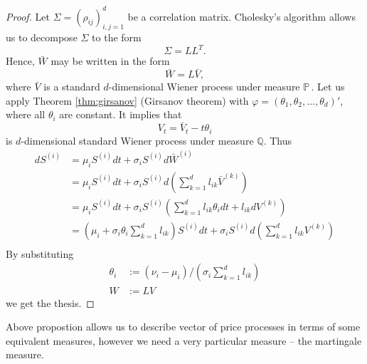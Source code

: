 \documentclass[a4paper,12pt, oneside]{book}
\theoremstyle{definition}
\theoremstyle{remark}
\def\P{{\mathbb{P}}\,}
\begin{document}
\begin{proof}
 Let $\Sigma = (\rho_{ij})_{i,j=1}^d$ be a correlation matrix. Cholesky's algorithm allows us to decompose $\Sigma$ to the form
 \[ \Sigma = LL^T. \]
 Hence, $\bar{W}$ may be written in the form
 \[ \bar{W} = L \bar{V}, \]
 where $\bar{V}$ is a standard $d$-dimensional Wiener process under measure $\P$. Let us apply Theorem \ref{thm:girsanov} (Girsanov theorem) with $\varphi = (\theta_1, \theta_2, \ldots, \theta_d)'$, where all $\theta_i$ are constant. It implies that
 \[ V_t = \bar{V}_t - t\theta_i \]
 is $d$-dimensional standard Wiener process under measure $\mathbb{Q}$. Thus
 \begin{equation*}
  \begin{split}
   dS^{(i)} &= \mu_i S^{(i)} dt + \sigma_i S^{(i)} d\bar{W}^{(i)} \\
            &= \mu_i S^{(i)} dt + \sigma_i S^{(i)} d\left(\sum\limits_{k=1}^d l_{ik} \bar{V}^{(k)}\right) \\
            &= \mu_i S^{(i)} dt + \sigma_i S^{(i)} \left(\sum\limits_{k=1}^d l_{ik}\theta_i dt + l_{ik}d V^{(k)}\right) \\    
            &= \left(\mu_i + \sigma_i \theta_i \sum\limits_{k=1}^d l_{ik} \right) S^{(i)} dt + \sigma_i S^{(i)} d\left(\sum\limits_{k=1}^d l_{ik} V^{(k)}\right) \\    
  \end{split}
 \end{equation*}
 By substituting
 \begin{align*}
  \theta_i &:= (\nu_i - \mu_i)/(\sigma_i \sum\limits_{k=1}^d l_{ik})\\
  W &:= LV
 \end{align*}
 we get the thesis.
\end{proof}

Above propostion allows us to describe vector of price processes in terms of some equivalent measures, however we need a very particular measure -- the martingale measure.
\end{document}

